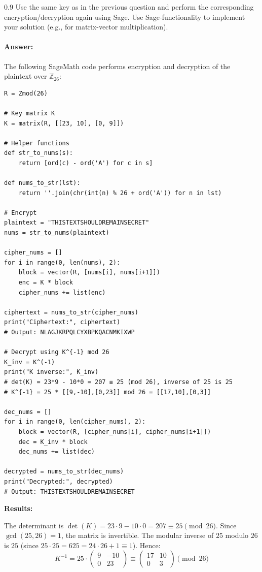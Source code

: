 \documentclass[]{scrartcl}
\newcounter{exercise}
\newcounter{qid}[section]
\newcommand{\exerciseprefix}{prefix}
\newcommand{\questiontitle}{Questions}
\newcommand{\blockid}{B3}
\newcommand{\exname}{}
\begin{document}
\renewcommand{\exerciseprefix}{PS-\blockid{}-E\theexercise: \exname-Q\theqid}
\renewcommand{\questiontitle}{\exerciseprefix{}: Encryption/Decryption in Sage}
\begin{exercisebox}{0.9}
Use the same key as in the previous question and perform the corresponding encryption/decryption again using Sage. Use Sage-functionality to implement your solution (e.g., for matrix-vector multiplication). 
\end{exercisebox}

\paragraph{Answer:}

The following SageMath code performs encryption and decryption of the plaintext over $\mathbb{Z}_{26}$:

\begin{lstlisting}[style=sageStyle, caption={Hill cipher encryption and decryption in SageMath}]
R = Zmod(26)

# Key matrix K
K = matrix(R, [[23, 10], [0, 9]])

# Helper functions
def str_to_nums(s):
    return [ord(c) - ord('A') for c in s]

def nums_to_str(lst):
    return ''.join(chr(int(n) % 26 + ord('A')) for n in lst)

# Encrypt
plaintext = "THISTEXTSHOULDREMAINSECRET"
nums = str_to_nums(plaintext)

cipher_nums = []
for i in range(0, len(nums), 2):
    block = vector(R, [nums[i], nums[i+1]])
    enc = K * block
    cipher_nums += list(enc)

ciphertext = nums_to_str(cipher_nums)
print("Ciphertext:", ciphertext)
# Output: NLAGJKRPQLCYXBPKQACNMKIXWP

# Decrypt using K^{-1} mod 26
K_inv = K^(-1)
print("K inverse:", K_inv)
# det(K) = 23*9 - 10*0 = 207 ≡ 25 (mod 26), inverse of 25 is 25
# K^{-1} = 25 * [[9,-10],[0,23]] mod 26 = [[17,10],[0,3]]

dec_nums = []
for i in range(0, len(cipher_nums), 2):
    block = vector(R, [cipher_nums[i], cipher_nums[i+1]])
    dec = K_inv * block
    dec_nums += list(dec)

decrypted = nums_to_str(dec_nums)
print("Decrypted:", decrypted)
# Output: THISTEXTSHOULDREMAINSECRET
\end{lstlisting}

\textbf{Results:}

The determinant is $\det(K) = 23 \cdot 9 - 10 \cdot 0 = 207 \equiv 25 \pmod{26}$. Since $\gcd(25,26)=1$, the matrix is invertible. The modular inverse of $25$ modulo $26$ is $25$ (since $25 \cdot 25 = 625 = 24\cdot 26 + 1 \equiv 1$). Hence:
\[
K^{-1} = 25 \cdot \begin{pmatrix}9 & -10 \\ 0 & 23\end{pmatrix} \equiv \begin{pmatrix}17 & 10 \\ 0 & 3\end{pmatrix} \pmod{26}
\]
\end{document}
